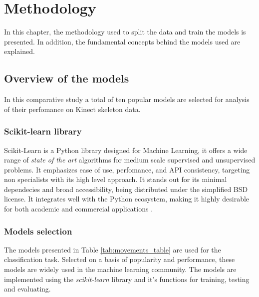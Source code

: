 \hypersetup{colorlinks=true, linkcolor=blue, citecolor=red}

\chapter{Methodology} \label{chap:methodology}

    In this chapter, the methodology used to split the data and train the models is presented. In addition, the fundamental concepts behind the models used are explained.

    \section{Overview of the models}

        In this comparative study a total of ten popular models are selected for analysis of their perfomance on Kinect skeleton data.

        \subsection{Scikit-learn library}  

            Scikit-Learn is a Python library designed for Machine Learning, it offers a wide range of \textit{state of the art} algorithms for medium scale supervised and unsupervised problems. It emphasizes ease of use, perfomance, and API consistency, targeting non specialists with its high level approach. It stands out for its minimal dependecies and broad accessibility, being distributed under the simplified BSD license. It integrates well with the Python ecosystem, making it highly desirable for both academic and commercial applications \cite{scikit-learn}.

        \subsection{Models selection}

        The models presented in Table \ref{tab:movements_table} are used for the classification task. Selected on a basis of popularity and performance, these models are widely used in the machine learning community. The models are implemented using the \textit{scikit-learn} library and it's functions for training, testing and evaluating\cite{sklearn_api}. 

        \newpage 

